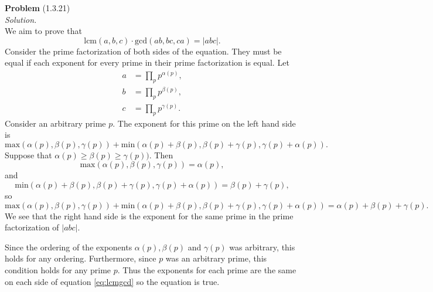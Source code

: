\documentclass[12 pt]{amsart}
\begin{document}
  

\vfill
\newpage



\phantom{\quad} \vfill
\noindent
\textbf{Problem} (1.3.21) \\[4ex]
\emph{Solution.} \\[2ex]
  We aim to prove that 
  \begin{equation}
  \label{eq:lcmgcd}
    \text{lcm}(a,b,c) \cdot \text{gcd}(ab,bc,ca) = \left| abc \right|.
  \end{equation}
  Consider the prime factorization of both sides of the equation.
  They must be equal if each exponent for every prime in their prime
  factorization is equal.
  Let 
  \begin{align*}
    a &= \prod_p p^{\alpha(p)}, \\
    b &= \prod_p p^{\beta(p)}, \\
    c &= \prod_p p^{\gamma(p)}.
  \end{align*}
  Consider an arbitrary prime $p$.
  The exponent for this prime on the left hand side is 
  \[
    \text{max}(\alpha(p), \beta(p), \gamma(p)) 
    +
    \text{min}(\alpha(p) + \beta(p), \beta(p) + \gamma(p), 
               \gamma(p) + \alpha(p)). 
  \]
  Suppose that $\alpha(p) \geq \beta(p) \geq \gamma(p))$.
  Then 
  \[
  \text{max}(\alpha(p), \beta(p), \gamma(p)) = \alpha(p),
  \]
  and 
  \[
    \text{min}(\alpha(p) + \beta(p), \beta(p) + \gamma(p), 
              \gamma(p) + \alpha(p)) 
              = \beta(p) + \gamma(p),
  \]
  so 
  \[
    \text{max}(\alpha(p), \beta(p), \gamma(p)) 
    +
    \text{min}(\alpha(p) + \beta(p), \beta(p) + \gamma(p), 
               \gamma(p) + \alpha(p))
    = 
    \alpha(p) + \beta(p) + \gamma(p).
  \]
  We see that the right hand side is the exponent for the same
  prime in the prime factorization of $|abc|$.

  Since the ordering of the exponents $\alpha(p), \beta(p)$ 
  and $\gamma(p)$
  was arbitrary, this holds for any ordering.
  Furthermore, since $p$ was an arbitrary prime,
  this condition holds for any prime $p$.
  Thus the exponents for each prime are the same on each
  side of equation \ref{eq:lcmgcd} so the equation is true.
\vfill
\newpage
\end{document}
